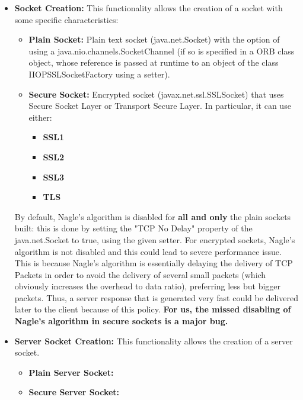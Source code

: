 \begin{itemize}
	\item \textbf{Socket Creation:} This functionality allows the creation of a socket with some specific characteristics:
	\begin{itemize}
		\item \textbf{Plain Socket:} Plain text socket (java.net.Socket) with the option of using a java.nio.channels.SocketChannel (if so is specified in a ORB class object, whose reference is passed at runtime to an object of the class IIOPSSLSocketFactory using a setter).
		\item \textbf{Secure Socket:} Encrypted socket (javax.net.ssl.SSLSocket) that uses Secure Socket Layer or Transport Secure Layer.
		In particular, it can use either:
		\begin{itemize}
			\item \textbf{SSL1} 
			\item \textbf{SSL2}
			\item \textbf{SSL3}
			\item \textbf{TLS}
		\end{itemize}
	\end{itemize}
	By default, Nagle's algorithm is disabled for \textbf{all and only} the plain sockets built: this is done by setting the "TCP No Delay" property of the java.net.Socket to true, using the given setter.
	For encrypted sockets, Nagle's algorithm is not disabled and this could lead to severe performance issue.
	This is because Nagle's algorithm is essentially delaying the delivery of TCP Packets in order to avoid the delivery of several small packets (which obviously increases the overhead to data ratio), preferring less but bigger packets.
	Thus, a server response that is generated very fast could be delivered later to the client because of this policy.
	\textbf{For us, the missed disabling of Nagle's algorithm in secure sockets is a major bug.}
	
	\item \textbf{Server Socket Creation:} This functionality allows the creation of a server socket.
	\begin{itemize}
		\item \textbf{Plain Server Socket:} %
		\item \textbf{Secure Server Socket:} %
	\end{itemize}
\end{itemize}
